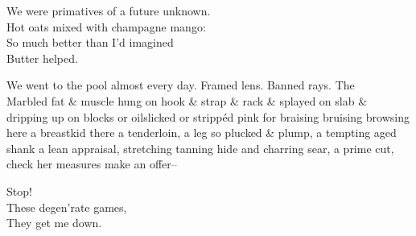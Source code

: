 We were primatives of a future unknown. \\
Hot oats mixed with champagne mango: \\
So much better than I'd imagined \\
Butter helped.

We went to the pool almost every day.
Framed lens. Banned rays. The \\
Marbled fat \& muscle hung on hook \& strap \& rack \& splayed on slab \& dripping up on blocks or oilslicked or strippéd pink for braising bruising browsing here a breastkid there a tenderloin, a leg so plucked \& plump, a tempting aged shank a lean appraisal, stretching tanning hide and charring sear, a prime cut, check her measures make an offer--

Stop! \\
These degen'rate games, \\
They get me down. \\
